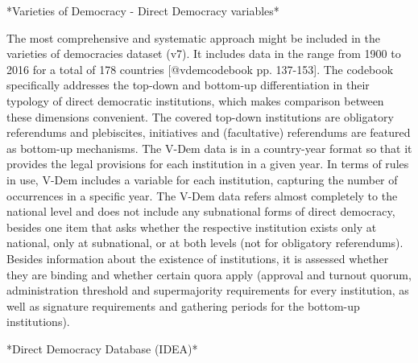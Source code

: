 \documentclass{systats}
\begin{document}
*Varieties of Democracy - Direct Democracy variables*

The most comprehensive and systematic approach might be included in the varieties of democracies dataset (v7). It includes data in the range from 1900 to 2016 for a total of 178 countries [@vdemcodebook pp. 137-153]. The codebook specifically addresses the top-down and bottom-up differentiation in their typology of direct democratic institutions, which makes comparison between these dimensions convenient. The covered top-down institutions are obligatory referendums and plebiscites, initiatives and (facultative) referendums are featured as bottom-up mechanisms. The V-Dem data is in a country-year format so that it provides the legal provisions for each institution in a given year. In terms of rules in use, V-Dem includes a variable for each institution, capturing the number of occurrences in a specific year. The V-Dem data refers almost completely to the national level and does not include any subnational forms of direct democracy, besides one item that asks whether the respective institution exists only at national, only at subnational, or at both levels (not for obligatory referendums). Besides information about the existence of institutions, it is assessed whether they are binding and whether certain quora apply (approval and turnout quorum, administration threshold and supermajority requirements for every institution, as well as signature requirements and gathering periods for the bottom-up institutions).  

*Direct Democracy Database (IDEA)*
\end{document}

